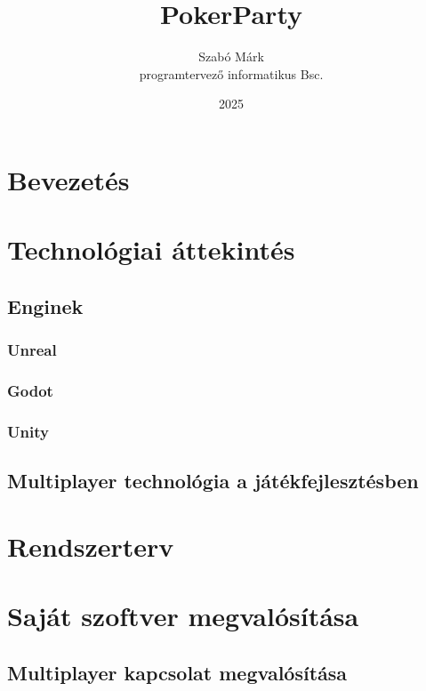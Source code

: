 \documentclass[]{thesis-ekf}
\theoremstyle{definition}
\theoremstyle{remark}
\begin{document}
\title{PokerParty}
\author{Szabó Márk\\programtervező informatikus Bsc.}
\date{2025}
\maketitle

\tableofcontents

\chapter*{Bevezetés}

\chapter{Technológiai áttekintés}

\section{Enginek}

\subsection{Unreal}

\subsection{Godot}

\subsection{Unity}

\section{Multiplayer technológia a játékfejlesztésben}

\chapter{Rendszerterv}

\chapter{Saját szoftver megvalósítása}
\section{Multiplayer kapcsolat megvalósítása}
\end{document}
